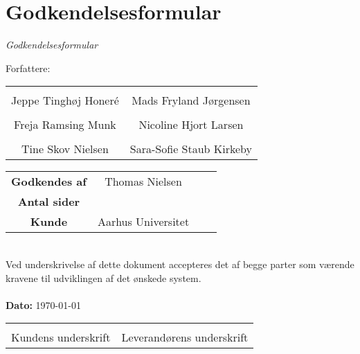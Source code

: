 \chapter{Godkendelsesformular}

{\LARGE\textit{Godkendelsesformular}}

{\large Forfattere:}
\\[5ex]


\begin{tabular}{c c}
\centering 
	\makebox[2.0in]{\hrulefill} & \makebox[2.0in]{\hrulefill}\\
	Jeppe Tinghøj Honeré & Mads Fryland Jørgensen\\[7ex]
	\makebox[2.0in]{\hrulefill} & \makebox[2.0in]{\hrulefill}\\
	Freja Ramsing Munk & Nicoline Hjort Larsen\\[7ex]
	\makebox[2.0in]{\hrulefill} & \makebox[2.0in]{\hrulefill}\\
	Tine Skov Nielsen& Sara-Sofie Staub Kirkeby\\[7ex]

\end{tabular}

\begin{tabular}{c c c c}
	\textbf{Godkendes af} & Thomas Nielsen\\[3ex]
	\textbf{Antal sider} & \pageref{LastPage} \\[3ex]
	\textbf{Kunde} & Aarhus Universitet
\end{tabular}\\[8ex]
Ved underskrivelse af dette dokument accepteres det af begge parter som værende kravene til udviklingen af det ønskede system.
\\
\\
\textbf{Dato: } \today \\[7ex]

\begin{tabular}{c c}
	\makebox[2.0in]{\hrulefill} & \makebox[2.0in]{\hrulefill}\\
	\centering 
	Kundens underskrift & Leverandørens underskrift
\end{tabular}
